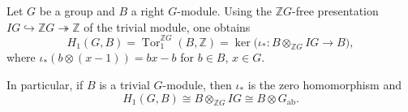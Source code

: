 Let $G$ be a group and $B$ a right $G$-module. Using the $\mathbb{Z}G$-free presentation $IG \hookrightarrow \mathbb{Z}G \twoheadrightarrow \mathbb{Z}$ of the trivial module, one obtains
$$H_1(G, B) = \operatorname{Tor}_1^{\mathbb{Z}G}(B, \mathbb{Z}) = \ker\!\big( \iota_* : B \otimes_{\mathbb{Z}G} IG \to B \big),$$
where $\iota_*(b \otimes (x-1)) = bx - b$ for $b \in B$, $x \in G$.

In particular, if $B$ is a trivial $G$-module, then $\iota_*$ is the zero homomorphism and
$$H_1(G, B) \cong B \otimes_{\mathbb{Z}G} IG \cong B \otimes G_{\text{ab}}.$$
